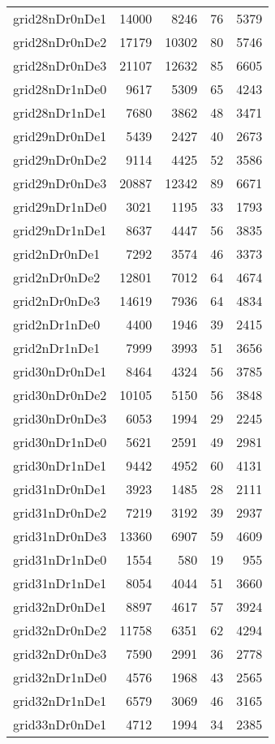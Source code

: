 \documentclass[../../../thesis.tex]{subfiles}
\begin{document}
\begin{longtable}{lrrrr}
grid28nDr0nDe1 & 14000 & 8246 & 76 & 5379 \\
grid28nDr0nDe2 & 17179 & 10302 & 80 & 5746 \\
grid28nDr0nDe3 & 21107 & 12632 & 85 & 6605 \\
grid28nDr1nDe0 & 9617 & 5309 & 65 & 4243 \\
grid28nDr1nDe1 & 7680 & 3862 & 48 & 3471 \\
grid29nDr0nDe1 & 5439 & 2427 & 40 & 2673 \\
grid29nDr0nDe2 & 9114 & 4425 & 52 & 3586 \\
grid29nDr0nDe3 & 20887 & 12342 & 89 & 6671 \\
grid29nDr1nDe0 & 3021 & 1195 & 33 & 1793 \\
grid29nDr1nDe1 & 8637 & 4447 & 56 & 3835 \\
grid2nDr0nDe1 & 7292 & 3574 & 46 & 3373 \\
grid2nDr0nDe2 & 12801 & 7012 & 64 & 4674 \\
grid2nDr0nDe3 & 14619 & 7936 & 64 & 4834 \\
grid2nDr1nDe0 & 4400 & 1946 & 39 & 2415 \\
grid2nDr1nDe1 & 7999 & 3993 & 51 & 3656 \\
grid30nDr0nDe1 & 8464 & 4324 & 56 & 3785 \\
grid30nDr0nDe2 & 10105 & 5150 & 56 & 3848 \\
grid30nDr0nDe3 & 6053 & 1994 & 29 & 2245 \\
grid30nDr1nDe0 & 5621 & 2591 & 49 & 2981 \\
grid30nDr1nDe1 & 9442 & 4952 & 60 & 4131 \\
grid31nDr0nDe1 & 3923 & 1485 & 28 & 2111 \\
grid31nDr0nDe2 & 7219 & 3192 & 39 & 2937 \\
grid31nDr0nDe3 & 13360 & 6907 & 59 & 4609 \\
grid31nDr1nDe0 & 1554 & 580 & 19 & 955 \\
grid31nDr1nDe1 & 8054 & 4044 & 51 & 3660 \\
grid32nDr0nDe1 & 8897 & 4617 & 57 & 3924 \\
grid32nDr0nDe2 & 11758 & 6351 & 62 & 4294 \\
grid32nDr0nDe3 & 7590 & 2991 & 36 & 2778 \\
grid32nDr1nDe0 & 4576 & 1968 & 43 & 2565 \\
grid32nDr1nDe1 & 6579 & 3069 & 46 & 3165 \\
grid33nDr0nDe1 & 4712 & 1994 & 34 & 2385 \\

\end{longtable}
\end{document}
